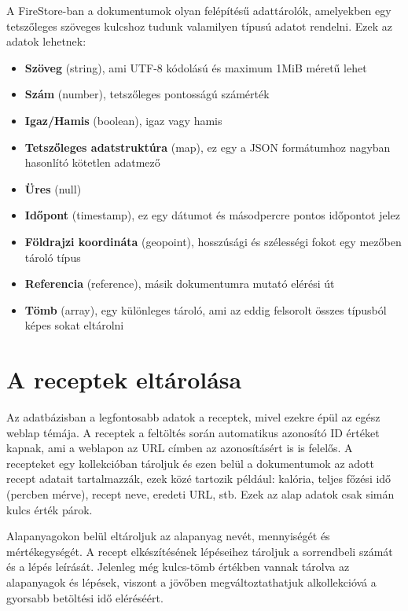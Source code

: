 \documentclass[12pt]{report}
\theoremstyle{definition}
\begin{document}
A FireStore-ban a dokumentumok olyan felépítésű adattárolók, amelyekben egy tetszőleges szöveges kulcshoz tudunk valamilyen típusú adatot rendelni. Ezek az adatok lehetnek: 

\begin{itemize}
	\item \textbf{Szöveg} (string), ami UTF-8 kódolású és maximum 1MiB méretű lehet
	\item \textbf{Szám} (number),  tetszőleges pontosságú számérték
	\item \textbf{Igaz/Hamis} (boolean), igaz vagy hamis
	\item \textbf{Tetszőleges adatstruktúra} (map), ez egy a JSON formátumhoz nagyban hasonlító kötetlen adatmező
	\item \textbf{Üres} (null)
	\item \textbf{Időpont} (timestamp), ez egy dátumot és másodpercre pontos időpontot jelez

	\item \textbf{Földrajzi koordináta} (geopoint), hosszúsági és szélességi fokot egy mezőben tároló típus

	\item \textbf{Referencia} (reference), másik dokumentumra mutató elérési út
	\item \textbf{Tömb} (array), egy különleges tároló, ami az eddig felsorolt összes típusból képes sokat eltárolni

\end{itemize}
 

\section{A receptek eltárolása}
Az adatbázisban a legfontosabb adatok a receptek, mivel ezekre épül az egész weblap témája. A receptek a feltöltés során automatikus azonosító ID értéket kapnak, ami a weblapon az URL címben az azonosításért is is felelős. A recepteket egy kollekcióban tároljuk és ezen belül a dokumentumok az adott recept adatait tartalmazzák, ezek közé tartozik például: kalória, teljes főzési idő (percben mérve), recept neve, eredeti URL, stb. Ezek az alap adatok csak simán kulcs érték párok.

Alapanyagokon belül eltároljuk az alapanyag nevét, mennyiségét és mértékegységét. A recept elkészítésének lépéseihez tároljuk a sorrendbeli számát és a lépés leírását. Jelenleg még kulcs-tömb értékben vannak tárolva az alapanyagok és lépések, viszont a jövőben megváltoztathatjuk alkollekcióvá a gyorsabb betöltési idő eléréséért.
\end{document}
